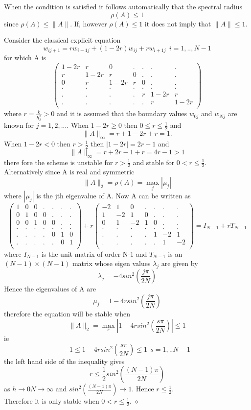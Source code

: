 When the condition is satisfied it follows automatically that the spectral radius
\[\rho(A)\leq 1\] since $\rho(A)\leq \lVert A\rVert $. If, however $\rho(A)\leq 1$ it does not imply that $\lVert A\rVert  \leq 1$.
\begin{example} 
Consider the classical explicit equation
\[ w_{ij+1}=rw_{i-1j}+(1-2r)w_{ij}+rw_{i+1j} \ \ i=1,..,N-1 \]
for which A is
\[
\left(\begin{array}{ccccccc}
1-2r&r&0&.&.&.&.\\
r&1-2r&r&0&.&.&.\\
0&r&1-2r&r&0&.&.\\
.&.&.&.&.&.&.\\
.&.&.&.&r&1-2r&r\\
.&.&.&.&.&r&1-2r\\
\end{array}\right)
\]
where $r=\frac{k}{h_x^2}>0$ and it is assumed that the boundary values $w_{0j}$ and $w_{Nj}$ are known for $j=1,2,...$.  When $1-2r \geq 0$ then $0\leq r \leq \frac{1}{2}$ and
\[ \lVert A\rVert_{\infty}=r+1-2r+r=1. \]
When $1-2r <0$ then $r >\frac{1}{2}$ then $|1-2r|=2r-1$
and
\[\lVert A\rVert_{\infty}=r+2r-1+r=4r-1>1\]
there fore the scheme is unstable for $r>\frac{1}{2}$ and stable for 
$0<r \leq \frac{1}{2}$.\\
Alternatively since A is real and symmetric 
\[\lVert A\rVert_2=\rho(A)=\max_j|\mu_j| \]
where $|\mu_j|$ is the jth eigenvalue of A. Now A can be written as
\[ \left(\begin{array}{ccccccc}
1&0&0&.&.&.&.\\
0&1&0&0&.&.&.\\
0&0&1&0&0&.&.\\
.&.&.&.&.&.&.\\
.&.&.&.&0&1&0\\
.&.&.&.&.&0&1\\
\end{array}\right)
+r\left(\begin{array}{ccccccc}
-2&1&0&.&.&.&.\\
1&-2&1&0&.&.&.\\
0&1&-2&1&0&.&.\\
.&.&.&.&.&.&.\\
.&.&.&.&1&-2&1\\
.&.&.&.&.&1&-2\\
\end{array}\right)=I_{N-1}+rT_{N-1}\]
where $I_{N-1}$ is the unit matrix of order N-1 and $T_{N-1}$ is an $(N-1)\times(N-1)$
matrix whose eigen values $\lambda_j$ are given by
\[ \lambda_j = -4 sin^2(\frac{j\pi}{2N}) \]
Hence the eigenvalues of A are
\[\mu_j=1-4rsin^2(\frac{j\pi}{2N}) \]
therefore the equation will be stable when
\[\lVert A\rVert_2=\max_s|1-4rsin^2(\frac{s\pi}{2N})|\leq 1\]
ie
\[ -1 \leq 1-4rsin^2(\frac{s\pi}{2N})\leq 1 \ \ s=1,..N-1\]
the left hand side of the inequality gives
\[ r \leq \frac{1}{2}sin^2(\frac{(N-1)\pi}{2N})\]
as $h \rightarrow 0 N\rightarrow \infty$ and $sin^2(\frac{(N-1)\pi}{2N})\rightarrow 1$. Hence $r\leq \frac{1}{2}$.\\
Therefore it is only stable when $0<r\leq \frac{1}{2}$.
$\diamond$
\end{example} 

